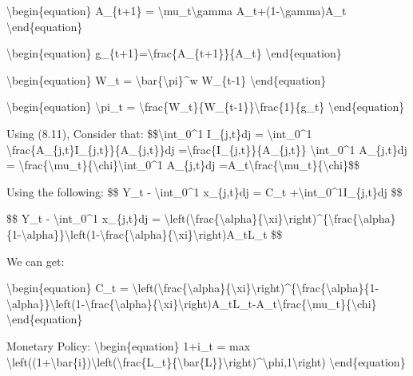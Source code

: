 \documentclass[10pt,math=newtx,citestyle=gb7714-2015,bibstyle=gb7714-2015]{elegantbook}
\begin{document}
	\textbackslash{}begin\{equation\}
	A\_\{t+1\} = \textbackslash{}mu\_t\textbackslash{}gamma A\_t+(1-\textbackslash{}gamma)A\_t
	\textbackslash{}end\{equation\}
	
	
	\textbackslash{}begin\{equation\}
	g\_\{t+1\}=\textbackslash{}frac\{A\_\{t+1\}\}\{A\_t\}
	\textbackslash{}end\{equation\}
	
	\textbackslash{}begin\{equation\}
	W\_t = \textbackslash{}bar\{\textbackslash{}pi\}\^{}w W\_\{t-1\}
	\textbackslash{}end\{equation\}
	
	\textbackslash{}begin\{equation\}
	\textbackslash{}pi\_t =  \textbackslash{}frac\{W\_t\}\{W\_\{t-1\}\}\textbackslash{}frac\{1\}\{g\_t\}
	\textbackslash{}end\{equation\}
	
	Using (8.11), Consider that:
	\$\$\textbackslash{}int\_0\^{}1 I\_\{j,t\}dj = \textbackslash{}int\_0\^{}1 \textbackslash{}frac\{A\_\{j,t\}I\_\{j,t\}\}\{A\_\{j,t\}\}dj =\textbackslash{}frac\{I\_\{j,t\}\}\{A\_\{j,t\}\} \textbackslash{}int\_0\^{}1 A\_\{j,t\}dj = \textbackslash{}frac\{\textbackslash{}mu\_t\}\{\textbackslash{}chi\}\textbackslash{}int\_0\^{}1 A\_\{j,t\}dj =A\_t\textbackslash{}frac\{\textbackslash{}mu\_t\}\{\textbackslash{}chi\}\$\$
	
	Using the following:
	\$\$
	Y\_t - \textbackslash{}int\_0\^{}1 x\_\{j,t\}dj = C\_t +\textbackslash{}int\_0\^{}1I\_\{j,t\}dj
	\$\$
	
	\$\$
	Y\_t - \textbackslash{}int\_0\^{}1 x\_\{j,t\}dj = \textbackslash{}left(\textbackslash{}frac\{\textbackslash{}alpha\}\{\textbackslash{}xi\}\textbackslash{}right)\^{}\{\textbackslash{}frac\{\textbackslash{}alpha\}\{1-\textbackslash{}alpha\}\}\textbackslash{}left(1-\textbackslash{}frac\{\textbackslash{}alpha\}\{\textbackslash{}xi\}\textbackslash{}right)A\_tL\_t
	\$\$
	
	We can get:
	
	\textbackslash{}begin\{equation\}
	C\_t =  \textbackslash{}left(\textbackslash{}frac\{\textbackslash{}alpha\}\{\textbackslash{}xi\}\textbackslash{}right)\^{}\{\textbackslash{}frac\{\textbackslash{}alpha\}\{1-\textbackslash{}alpha\}\}\textbackslash{}left(1-\textbackslash{}frac\{\textbackslash{}alpha\}\{\textbackslash{}xi\}\textbackslash{}right)A\_tL\_t-A\_t\textbackslash{}frac\{\textbackslash{}mu\_t\}\{\textbackslash{}chi\}
	\textbackslash{}end\{equation\}
	
	
	Monetary Policy:
	\textbackslash{}begin\{equation\}
	1+i\_t = max \textbackslash{}left((1+\textbackslash{}bar\{i\})\textbackslash{}left(\textbackslash{}frac\{L\_t\}\{\textbackslash{}bar\{L\}\}\textbackslash{}right)\^{}\textbackslash{}phi,1\textbackslash{}right)
	\textbackslash{}end\{equation\}
	
\end{document}
